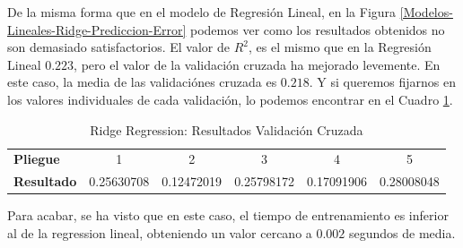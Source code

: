 De la misma forma que en el modelo de Regresión Lineal, en la Figura \ref{Modelos-Lineales-Ridge-Prediccion-Error} podemos ver como los resultados obtenidos no son demasiado satisfactorios. El valor de $R^2$, es el mismo que en la Regresión Lineal $0.223$, pero el valor de la validación cruzada ha mejorado levemente. En este caso, la media de las validaciónes cruzada es $0.218$. Y si queremos fijarnos en los valores individuales de cada validación, lo podemos encontrar en el Cuadro \ref{Modelos-Lineales-Ridge-Validacion-Cruzada}.

\begin{table}[h]
    \centering
    \begin{tabular}{lccccc}
        \textbf{Pliegue} & 1 & 2 & 3 & 4 & 5 \\
        \textbf{Resultado} & 0.25630708 & 0.12472019 & 0.25798172 & 0.17091906 & 0.28008048
    \end{tabular}
    \caption{Ridge Regression: Resultados Validación Cruzada}
    \label{Modelos-Lineales-Ridge-Validacion-Cruzada}
\end{table}

Para acabar, se ha visto que en este caso, el tiempo de entrenamiento es inferior al de la regression lineal, obteniendo un valor cercano a $0.002$ segundos de media. 